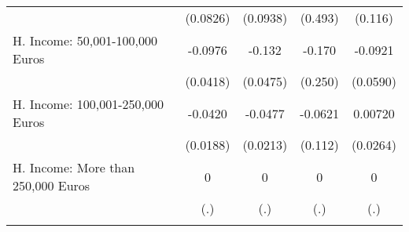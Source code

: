 {\begin{tabular}{l*{4}{c}}
            &    (0.0826)         &    (0.0938)         &     (0.493)         &     (0.116)         \\
[1em]
H. Income: 50,001-100,000 Euros&     -0.0976\sym{*}  &      -0.132\sym{**} &      -0.170         &     -0.0921         \\
            &    (0.0418)         &    (0.0475)         &     (0.250)         &    (0.0590)         \\
[1em]
H. Income: 100,001-250,000 Euros&     -0.0420\sym{*}  &     -0.0477\sym{*}  &     -0.0621         &     0.00720         \\
            &    (0.0188)         &    (0.0213)         &     (0.112)         &    (0.0264)         \\
[1em]
H. Income: More than 250,000 Euros&           0         &           0         &           0         &           0         \\
            &         (.)         &         (.)         &         (.)         &         (.)         \\
\hline\hline
{}\\
\end{tabular}
}
